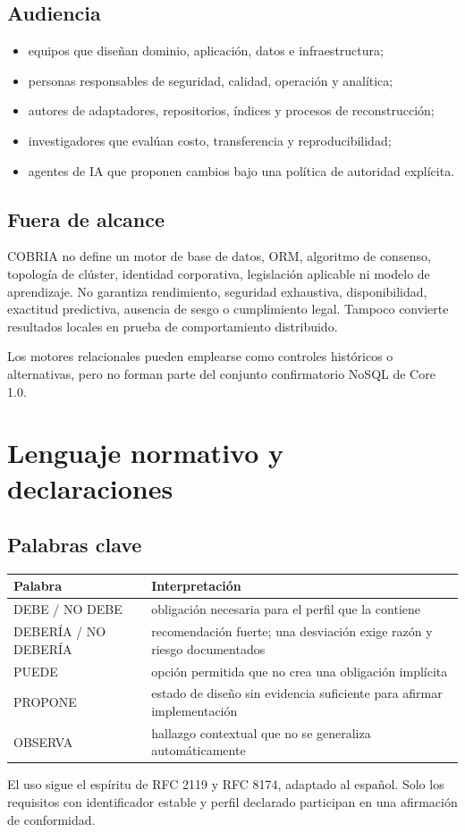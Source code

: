 \documentclass[11pt,letterpaper]{article}
\begin{document}
\subsection{Audiencia}
\begin{itemize}
\item equipos que diseñan dominio, aplicación, datos e infraestructura;
\item personas responsables de seguridad, calidad, operación y analítica;
\item autores de adaptadores, repositorios, índices y procesos de reconstrucción;
\item investigadores que evalúan costo, transferencia y reproducibilidad;
\item agentes de IA que proponen cambios bajo una política de autoridad explícita.
\end{itemize}

\subsection{Fuera de alcance}
COBRIA no define un motor de base de datos, ORM, algoritmo de consenso, topología de
clúster, identidad corporativa, legislación aplicable ni modelo de aprendizaje. No
garantiza rendimiento, seguridad exhaustiva, disponibilidad, exactitud predictiva,
ausencia de sesgo o cumplimiento legal. Tampoco convierte resultados locales en prueba
de comportamiento distribuido.

Los motores relacionales pueden emplearse como controles históricos o alternativas,
pero no forman parte del conjunto confirmatorio NoSQL de Core 1.0.

\section{Lenguaje normativo y declaraciones}
\subsection{Palabras clave}
\begin{longtable}{p{.22\linewidth}p{.7\linewidth}}
\toprule Palabra & Interpretación \\ \midrule
DEBE / NO DEBE & obligación necesaria para el perfil que la contiene \\
DEBERÍA / NO DEBERÍA & recomendación fuerte; una desviación exige razón y riesgo documentados \\
PUEDE & opción permitida que no crea una obligación implícita \\
PROPONE & estado de diseño sin evidencia suficiente para afirmar implementación \\
OBSERVA & hallazgo contextual que no se generaliza automáticamente \\ \bottomrule
\end{longtable}
El uso sigue el espíritu de RFC 2119 y RFC 8174, adaptado al español. Solo los requisitos
con identificador estable y perfil declarado participan en una afirmación de conformidad.
\end{document}
